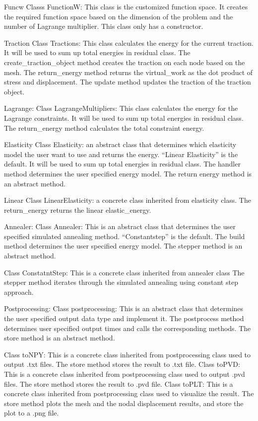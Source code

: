 \documentclass[letterpaper,10pt,english]{sphinxmanual}
\begin{document}
Funcw
Classs FunctionW: This class is the customized function space. It creates the required function space based on the dimension of the problem and the number of Lagrange multiplier. This class only has a constructor.

Traction
Class Tractions: This class calculates the energy for the current traction. It will be used to sum up total energies in residual class.
The create\_traction\_object method creates the traction on each node based on the mesh.
The return\_energy method returns the virtual\_work as the dot product of stress and displacement.
The update method updates the traction of the traction object.

Lagrange:
Class LagrangeMultipliers: This class calculates the energy for the Lagrange constraints. It will be used to sum up total energies in residual class.
The return\_energy method calculates the total constraint energy.

Elasticity
Class Elasticity: an abstract class that determines which elasticity model the user want to use and returns the energy. “Linear Elasticity” is the default. It will be used to sum up total energies in residual class.
The handler method determines the user specified energy model.
The return energy method is an abstract method.

Linear
Class LinearElasticity: a concrete class inherited from elasticity class.
The return\_energy returns the linear elastic\_energy.

Annealer:
Class Annealer: This is an abstract class that determines the user specified simulated annealing method. “Constantstep” is the default.
The build method determines the user specified energy model.
The stepper method is an abstract method.

Class ConstatntStep: This is a concrete class inherited from annealer class
The stepper method iterates through the simulated annealing using constant step approach.

Postprocessing:
Class postprocessing: This is an abstract class that determines the user specified output data type and implement it.
The postprocess method determines user specified output times and calls the corresponding methods.
The store method is an abstract method.

Class toNPY: This is a concrete class inherited from postprocessing class used to output .txt files.
The store method stores the result to .txt file.
Class toPVD: This is a concrete class inherited from postprocessing class used to output .pvd files.
The store method stores the result to .pvd file.
Class toPLT: This is a concrete class inherited from postprocessing class used to visualize the result.
The store method plots the mesh and the nodal displacement results, and store the plot to a .png file.
\end{document}
